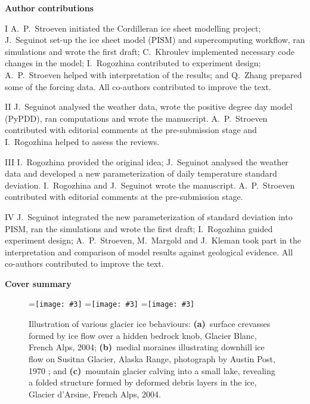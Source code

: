 \documentclass[a4paper]{kappa}
\newcommand{\subgraphics}[3][,]{%
  \setbox1=\hbox{\texttt{[image: \#3]}}%
  \leavevmode\rlap{\usebox1}%
  \rlap{\hspace*{0.25em}
        \raisebox{\dimexpr\ht1-3ex}{\textbf{(#2)}}}%
  \phantom{\usebox1}%
}
\begin{document}
\begin{frontmatter}
\begin{thepapers}
\noindent\textbf{Author contributions}
\footnotesize{\begin{paper}
  \item[I] A.~P.~Stroeven initiated the Cordilleran ice sheet modelling
project; J.~Seguinot set-up the ice sheet model (PISM) and supercomputing
workflow, ran simulations and wrote the first draft; C.~Khroulev implemented
necessary code changes in the model; I.~Rogozhina contributed to experiment
design; A.~P.~Stroeven helped with interpretation of the results; and Q.~Zhang
prepared some of the forcing data. All co-authors contributed to improve the
text.
  \item[II] J.~Seguinot analysed the weather data, wrote the positive degree
day model (PyPDD), ran computations and wrote the manuscript. A.~P.~Stroeven
contributed with editorial comments at the pre-submission stage and
I.~Rogozhina helped to assess the reviews.
  \item[III] I.~Rogozhina provided the original idea; J.~Seguinot analysed the
weather data and developed a new parameterization of daily temperature standard
deviation. I.~Rogozhina and J.~Seguinot wrote the manuscript. A.~P.~Stroeven
contributed with editorial comments at the pre-submission stage.
  \item[IV] J.~Seguinot integrated the new parameterization of standard
deviation into PISM, ran the simulations and wrote the first draft;
I.~Rogozhina guided experiment design; A.~P.~Stroeven, M.~Margold and J.~Kleman
took part in the interpretation and comparison of model results against
geological evidence. All co-authors contributed to improve the text.
\end{paper}}

\end{thepapers}

\end{frontmatter}

\onecolumn

\hfill \textbf{\huge Cover summary}
\vfill
\tableofcontents

\newpage

\begin{figure}[b]
  \subgraphics{a}{photo-glacier-crevasses}%
  \hspace{1cm}%
  \subgraphics{b}{photo-glacier-susitna}%
  \hspace{1cm}%
  \subgraphics{c}{photo-glacier-fold}%
  \caption{Illustration of various glacier ice behaviours:
           \textbf{(a)}~surface crevasses formed by ice flow over a hidden
           bedrock knob, Glacier Blanc, French Alps, 2004;
           \textbf{(b)}~medial moraines illustrating downhill ice flow on
           Susitna Glacier, Alaska Range, photograph by Austin Post, 1970
           \citep{NSIDC.2009}; and
           \textbf{(c)}~mountain glacier calving into a small lake, revealing a
           folded structure formed by deformed debris layers in the ice,
           Glacier d'Arsine, French Alps, 2004.}
  \label{fig:glacier-mechanics}
\end{figure}
\end{document}
